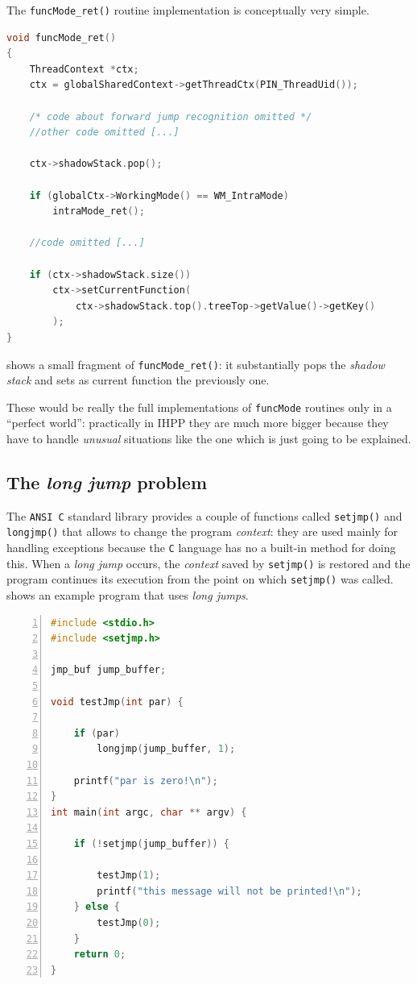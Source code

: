 \documentclass[a4paper,10pt]{report}
\begin{document}
The \verb|funcMode_ret()| routine implementation is conceptually very simple.

\begin{lstlisting}[language=C++, 
	caption={a fragment of \texttt{funcMode\_ret()} routine}, 
	label=funcret, frame=leftline]
void funcMode_ret()
{
	ThreadContext *ctx;
	ctx = globalSharedContext->getThreadCtx(PIN_ThreadUid());

	/* code about forward jump recognition omitted */
	//other code omitted [...]

	ctx->shadowStack.pop();

	if (globalCtx->WorkingMode() == WM_IntraMode)
		intraMode_ret();

	//code omitted [...]

	if (ctx->shadowStack.size())
		ctx->setCurrentFunction(
			ctx->shadowStack.top().treeTop->getValue()->getKey()
		);
}
\end{lstlisting}

\noindent
{} shows a small fragment of \verb|funcMode_ret()|: 
it substantially pops the \emph{shadow stack} and sets as current function
the previously one. 

These would be really the full implementations of \verb|funcMode| routines
only in a ``perfect world'': practically in IHPP they are much more bigger
because they have to handle \emph{unusual} situations like the one
which is just going to be explained.

\subsection{The \emph{long jump} problem}

The \verb|ANSI C| standard library provides a couple of functions called 
\verb|setjmp()| and \verb|longjmp()| that allows to change the program \emph{context}:
they are used mainly for handling exceptions because the \verb|C| language 
has no a built-in method for doing this. 
When a \emph{long jump} occurs, the \emph{context} saved by \verb|setjmp()| is restored
and the program continues its execution from the point on which \verb|setjmp()| was called.
 shows an example program that uses \emph{long jumps}.

\begin{lstlisting}[language=C++, 
	caption={source code of \texttt{prog7.c}}, 
	label=longjmp1, frame=leftline, numbers=left, showstringspaces=false]
#include <stdio.h>
#include <setjmp.h>

jmp_buf jump_buffer;

void testJmp(int par) {

	if (par) 
		longjmp(jump_buffer, 1);

	printf("par is zero!\n");
}
int main(int argc, char ** argv) {

	if (!setjmp(jump_buffer)) {

		testJmp(1);
		printf("this message will not be printed!\n");	
	} else {
		testJmp(0);
	}	
	return 0;
}
\end{lstlisting}
\end{document}
